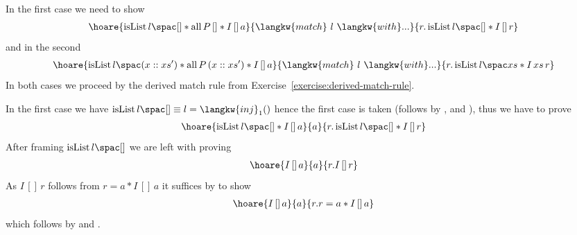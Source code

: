 In the first case we need to show
\begin{align*}
\hoare{ \isList {l} {[]} \ast \operatorname{all} P \, [] \ast  I \, [] \, a}
{\langkw{match}\ l\ \langkw{with} ...}
{r.  \isList {l} {[]} \ast I \, []\, r} 
\end{align*}
and in the second
\begin{align*}
\hoare{ \isList {l} {(x::xs')} \ast \operatorname{all} P \, (x::xs') \ast  I \, [] \, a}
{\langkw{match}\ l\ \langkw{with} ...}
{r.  \isList {l} {xs} \ast I \, xs\, r}
\end{align*}
In both cases we proceed by the derived match rule from Exercise~\ref{exercise:derived-match-rule}.

In the first case we have $\isList {l} {[]} \equiv l = \langkw{inj}_1()$ hence the first case is taken (follows by ,  and ), thus we have to prove
\begin{align*}
\hoare{ \isList {l} {[]} \ast  I \, [] \, a}{a}{r.  \isList {l} {[]} \ast I \, []\, r} 
\end{align*}
After framing $ \isList {l} {[]} $ we are left with proving
\begin{align*}
\hoare{ I \, [] \, a}{a}{r. I\, [] \, r} 
\end{align*}
As $I \, [] \, r $ follows from $r = a \ast I \, [] \, a$ it suffices by  to show
\begin{align*}
\hoare{ I \, [] \, a}{a}{r.r=a \ast I \, [] \, a }
\end{align*}
which follows by  and .

